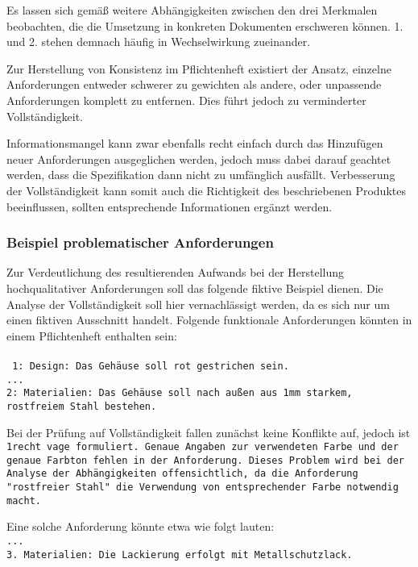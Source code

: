 \documentclass[12pt]{report}
\begin{document}
Es lassen sich gemäß \cite{zg02} weitere Abhängigkeiten zwischen den drei Merkmalen beobachten, die die Umsetzung in konkreten Dokumenten erschweren können. 1. und 2. stehen demnach häufig in Wechselwirkung zueinander. 

Zur Herstellung von Konsistenz im Pflichtenheft existiert der Ansatz, einzelne Anforderungen entweder schwerer zu gewichten als andere, oder unpassende Anforderungen komplett zu entfernen. Dies führt jedoch zu verminderter Vollständigkeit. 

Informationsmangel kann zwar ebenfalls recht einfach durch das Hinzufügen neuer Anforderungen ausgeglichen werden, jedoch muss dabei darauf geachtet werden, dass die Spezifikation dann nicht zu umfänglich ausfällt. Verbesserung der Vollständigkeit kann somit auch die Richtigkeit des beschriebenen Produktes beeinflussen, sollten entsprechende Informationen ergänzt werden.

\subsubsection{Beispiel problematischer Anforderungen}
Zur Verdeutlichung des resultierenden Aufwands bei der Herstellung hochqualitativer Anforderungen soll das folgende fiktive Beispiel dienen. Die Analyse der Vollständigkeit soll hier vernachlässigt werden, da es sich nur um einen fiktiven Ausschnitt handelt. Folgende funktionale Anforderungen könnten in einem Pflichtenheft enthalten sein:
\\
\\ \tt
1: Design: Das Gehäuse soll rot gestrichen sein.\\
...\\
2: Materialien: Das Gehäuse soll nach außen aus 1mm starkem, \\rostfreiem Stahl bestehen.\\
\rm

Bei der Prüfung auf Vollständigkeit fallen zunächst keine Konflikte auf, jedoch ist \tt 1\rm recht vage formuliert. Genaue Angaben zur verwendeten Farbe und der genaue Farbton fehlen in der Anforderung. Dieses Problem wird bei der Analyse der Abhängigkeiten offensichtlich, da die Anforderung "rostfreier Stahl" die Verwendung von entsprechender Farbe notwendig macht. 

Eine solche Anforderung könnte etwa wie folgt lauten:
\\
\tt ...\\
3. Materialien: Die Lackierung erfolgt mit Metallschutzlack.\\
\rm
\end{document}
